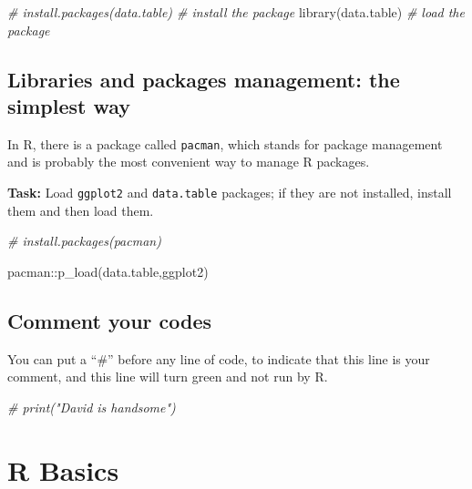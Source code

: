 \documentclass[
  11pt,
]{book}
\newenvironment{Shaded}{\begin{snugshade}}{\end{snugshade}}
\newcommand{\CommentTok}[1]{\textcolor[rgb]{0.56,0.35,0.01}{\textit{#1}}}
\newcommand{\FunctionTok}[1]{\textcolor[rgb]{0.00,0.00,0.00}{#1}}
\newcommand{\NormalTok}[1]{#1}
\newcommand{\SpecialCharTok}[1]{\textcolor[rgb]{0.00,0.00,0.00}{#1}}
\newcommand{\StringTok}[1]{\textcolor[rgb]{0.31,0.60,0.02}{#1}}
\begin{document}
\begin{Shaded}
\begin{Highlighting}[]
\CommentTok{\# install.packages(\textquotesingle{}data.table\textquotesingle{}) \# install the package}
\FunctionTok{library}\NormalTok{(}\StringTok{\textquotesingle{}data.table\textquotesingle{}}\NormalTok{) }\CommentTok{\# load the package}
\end{Highlighting}
\end{Shaded}

\hypertarget{libraries-and-packages-management-the-simplest-way}{%
\section{Libraries and packages management: the simplest way}\label{libraries-and-packages-management-the-simplest-way}}

In R, there is a package called \texttt{pacman}, which stands for package management and is probably the most convenient way to manage R packages.

\textbf{Task:} Load \texttt{ggplot2} and \texttt{data.table} packages; if they are not installed, install them and then load them.

\begin{Shaded}
\begin{Highlighting}[]
\CommentTok{\# install.packages(\textquotesingle{}pacman\textquotesingle{})}

\NormalTok{pacman}\SpecialCharTok{::}\FunctionTok{p\_load}\NormalTok{(data.table,ggplot2)}
\end{Highlighting}
\end{Shaded}

\hypertarget{comment-your-codes}{%
\section{Comment your codes}\label{comment-your-codes}}

You can put a ``\#'' before any line of code, to indicate that this line is your comment, and this line will turn green and not run by R.

\begin{Shaded}
\begin{Highlighting}[]
\CommentTok{\# print("David is handsome")}
\end{Highlighting}
\end{Shaded}

\hypertarget{r-basics}{%
\chapter{R Basics}\label{r-basics}}
\end{document}
